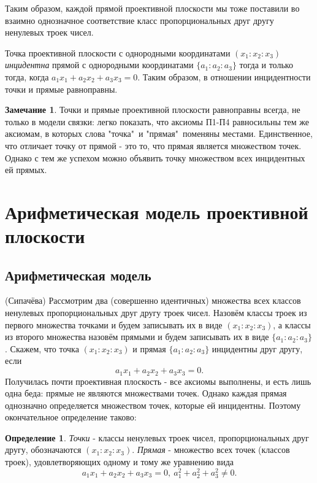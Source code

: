\documentclass[a4paper, 12pt]{article}
\theoremstyle{definition}
\newtheorem*{definition}{Определение}
\newtheorem*{remark}{Замечание}
\begin{document}
Таким образом, каждой прямой проективной плоскости мы тоже поставили во взаимно однозначное соответствие класс пропорциональных друг другу ненулевых троек чисел.

Точка проективной плоскости с однородными координатами $(x_1:x_2:x_3)$ \textit{инцидентна} прямой с однородными координатами $\{a_1:a_2:a_3\}$ тогда и только тогда, когда $a_1x_1 + a_2x_2 + a_3x_3 = 0$. Таким образом, в отношении инцидентности точки и прямые равноправны.

\begin{remark}
    Точки и прямые проективной плоскости равноправны всегда, не только в модели связки: легко показать, что аксиомы П1-П4 равносильны тем же аксиомам, в которых слова "точка"\ и "прямая"\ поменяны местами. Единственное, что отличает точку от прямой - это то, что прямая является множеством точек. Однако с тем же успехом можно объявить точку множеством всех инцидентных ей прямых.
\end{remark}


\section{Арифметическая модель проективной плоскости}
\subsection{Арифметическая модель}
(Сипачёва) Рассмотрим два (совершенно идентичных) множества всех классов ненулевых пропорциональных друг другу троек чисел. Назовём классы троек из первого множества точками и будем записывать их в виде $(x_1:x_2:x_3)$, а классы из второго множества назовём прямыми и будем записывать их в виде $\{a_1:a_2:a_3\}$. 
Скажем, что точка $(x_1:x_2:x_3)$ и прямая $\{a_1:a_2:a_3\}$ инцидентны друг другу, если \[ a_1x_1 + a_2x_2 + a_3x_3 = 0. \]
Получилась почти проективная плоскость - все аксиомы выполнены, и есть лишь одна беда: прямые не являются множествами точек. Однако каждая прямая однозначно определяется множеством точек, которые ей инцидентны. Поэтому окончательное определение таково:

\begin{definition}
    \textit{Точки} - классы ненулевых троек чисел, пропорциональных друг другу, обозначаются $(x_1:x_2:x_3)$.
    \textit{Прямая} - множество всех точек (классов троек), удовлетворяющих одному и тому же уравнению вида \[ a_1x_1 + a_2x_2 + a_3x_3 = 0, \ a_1^2 + a_2^2 + a_3^2 \neq 0. \]
\end{definition}
\end{document}
